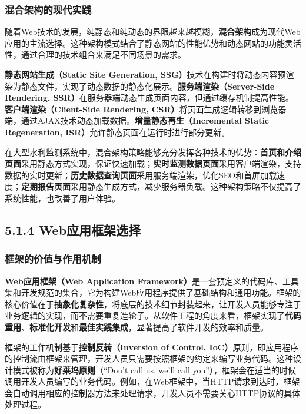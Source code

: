 \subsubsection{混合架构的现代实践}\label{ux6df7ux5408ux67b6ux6784ux7684ux73b0ux4ee3ux5b9eux8df5}

随着Web技术的发展，纯静态和纯动态的界限越来越模糊，\textbf{混合架构}成为现代Web应用的主流选择。这种架构模式结合了静态网站的性能优势和动态网站的功能灵活性，通过合理的技术组合来满足不同场景的需求。

\textbf{静态网站生成（Static Site Generation, SSG）}技术在构建时将动态内容预渲染为静态文件，实现了动态数据的静态化展示。\textbf{服务端渲染（Server-Side Rendering, SSR）}在服务器端动态生成页面内容，但通过缓存机制提高性能。\textbf{客户端渲染（Client-Side Rendering, CSR）}将页面生成逻辑转移到浏览器端，通过AJAX技术动态加载数据。\textbf{增量静态再生（Incremental Static Regeneration, ISR）}允许静态页面在运行时进行部分更新。

在大型水利监测系统中，混合架构策略能够充分发挥各种技术的优势：\textbf{首页和介绍页面}采用静态方式实现，保证快速加载；\textbf{实时监测数据页面}采用客户端渲染，支持数据的实时更新；\textbf{历史数据查询页面}采用服务端渲染，优化SEO和首屏加载速度；\textbf{定期报告页面}采用静态生成方式，减少服务器负载。这种架构策略不仅提高了系统性能，也改善了用户体验。

\subsection{5.1.4 Web应用框架选择}\label{webux5e94ux7528ux6846ux67b6ux9009ux62e9}

\subsubsection{框架的价值与作用机制}\label{ux6846ux67b6ux7684ux4ef7ux503cux4e0eux4f5cux7528ux673aux5236}

\textbf{Web应用框架（Web Application Framework）}是一套预定义的代码库、工具集和开发规范的集合，它为构建Web应用程序提供了基础结构和通用功能。框架的核心价值在于\textbf{抽象化复杂性}，将底层的技术细节封装起来，让开发人员能够专注于业务逻辑的实现，而不需要重复造轮子。从软件工程的角度来看，框架实现了\textbf{代码重用}、\textbf{标准化开发}和\textbf{最佳实践集成}，显著提高了软件开发的效率和质量。

框架的工作机制基于\textbf{控制反转（Inversion of Control, IoC）}原则，即应用程序的控制流由框架来管理，开发人员只需要按照框架的约定来编写业务代码。这种设计模式被称为\textbf{好莱坞原则}（``Don't call us, we'll call you''），框架会在适当的时候调用开发人员编写的业务代码。例如，在Web框架中，当HTTP请求到达时，框架会自动调用相应的控制器方法来处理请求，开发人员不需要关心HTTP协议的具体处理过程。

